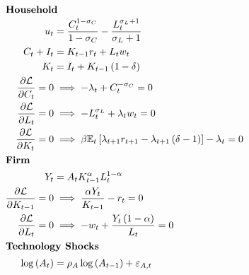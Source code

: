 \begin{align}
\intertext{\textbf{Household}}
u_{t} &= \frac{C_{t}^{1 - \sigma_{C}}}{1 - \sigma_{C}} - \frac{L_{t}^{\sigma_{L} + 1}}{\sigma_{L} + 1} \\
C_{t} + I_{t} &= K_{t-1} r_{t} + L_{t} w_{t} \\
K_{t} &= I_{t} + K_{t-1} \left(1 - \delta\right) \\
\frac{\partial \mathcal{L}}{\partial C_{t}} = 0 &\implies - \lambda_{t} + C_{t}^{- \sigma_{C}} = 0 \\
\frac{\partial \mathcal{L}}{\partial L_{t}} = 0 &\implies - L_{t}^{\sigma_{L}} + \lambda_{t} w_{t} = 0 \\
\frac{\partial \mathcal{L}}{\partial K_{t}} = 0 &\implies \beta \mathbb{E}_t\left[\lambda_{t+1} r_{t+1} - \lambda_{t+1} \left(\delta - 1\right)\right] - \lambda_{t} = 0 \\
\intertext{\textbf{Firm}}
Y_{t} &= A_{t} K_{t-1}^{\alpha} L_{t}^{1 - \alpha} \\
\frac{\partial \mathcal{L}}{\partial K_{t-1}} = 0 &\implies \frac{\alpha Y_{t}}{K_{t-1}} - r_{t} = 0 \\
\frac{\partial \mathcal{L}}{\partial L_{t}} = 0 &\implies - w_{t} + \frac{Y_{t} \left(1 - \alpha\right)}{L_{t}} = 0 \\
\intertext{\textbf{Technology Shocks}}
\log{\left(A_{t} \right)} &= \rho_{A} \log{\left(A_{t-1} \right)} + \varepsilon_{A,t}
\end{align}
